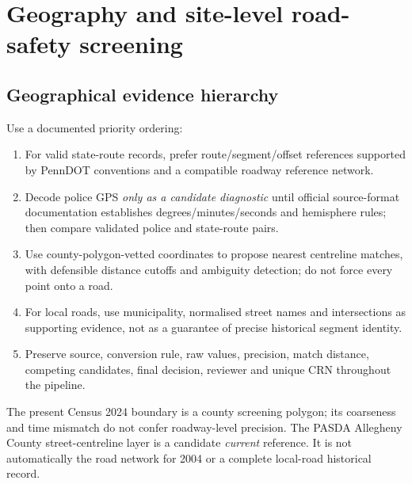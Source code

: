 \documentclass[11pt,a4paper,openany]{report}
\begin{document}
\chapter{Geography and site-level road-safety screening}
\section{Geographical evidence hierarchy}
Use a documented priority ordering:
\begin{enumerate}
\item For valid state-route records, prefer route/segment/offset references supported by PennDOT conventions and a compatible roadway reference network.
\item Decode police GPS \emph{only as a candidate diagnostic} until official source-format documentation establishes degrees/minutes/seconds and hemisphere rules; then compare validated police and state-route pairs.
\item Use county-polygon-vetted coordinates to propose nearest centreline matches, with defensible distance cutoffs and ambiguity detection; do not force every point onto a road.
\item For local roads, use municipality, normalised street names and intersections as supporting evidence, not as a guarantee of precise historical segment identity.
\item Preserve source, conversion rule, raw values, precision, match distance, competing candidates, final decision, reviewer and unique CRN throughout the pipeline.
\end{enumerate}
The present Census 2024 boundary is a county screening polygon; its coarseness and time mismatch do not confer roadway-level precision. The PASDA Allegheny County street-centreline layer \cite{PASDA} is a candidate \emph{current} reference. It is not automatically the road network for 2004 or a complete local-road historical record.
\end{document}
